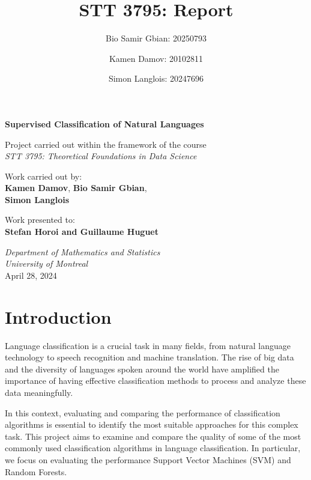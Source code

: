 \documentclass[11pt]{article}
\title{STT 3795: Report}
\author{Bio Samir Gbian: 20250793}
\author{Kamen Damov: 20102811}
\author{Simon Langlois: 20247696}
\affil{Department of Mathematics and Statistics}
\affil{University of Montreal}
\begin{document}
\begin{titlepage}
    \begin{center}
        \vspace*{1cm}
            
        \Huge
        \textbf{Supervised Classification of Natural Languages}
            
        \vspace{0.5cm}
        \Large
        Project carried out within the framework of the course \\\textit{STT 3795: Theoretical Foundations in Data Science}
            
        \vspace{1.5cm}

        Work carried out by:\\
        \textbf{Kamen Damov},
        \textbf{Bio Samir Gbian},\\
        \textbf{Simon Langlois}
            
        \vfill
            
        Work presented to:\\
        \textbf{Stefan Horoi and Guillaume Huguet}
            
        \vspace{0.8cm}
                        
        \Large
        \textit{Department of Mathematics and Statistics} \\
        \textit{University of Montreal} \\
        April 28, 2024
            
    \end{center}
\end{titlepage}

\tableofcontents

\newpage
\section{Introduction}
Language classification is a crucial task in many fields, from natural language technology to speech recognition and machine translation. The rise of big data and the diversity of languages spoken around the world have amplified the importance of having effective classification methods to process and analyze these data meaningfully.

In this context, evaluating and comparing the performance of classification algorithms is essential to identify the most suitable approaches for this complex task. This project aims to examine and compare the quality of some of the most commonly used classification algorithms in language classification. In particular, we focus on evaluating the performance Support Vector Machines (SVM) and Random Forests.
\end{document}
